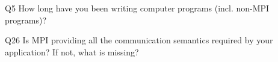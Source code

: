 \begin{description}%
\item{Q5} How long have you been writing computer programs (incl. non-MPI programs)?%
\item{Q26} Is MPI providing all the communication semantics required by your application? If not, what is missing?%
\end{description}%
